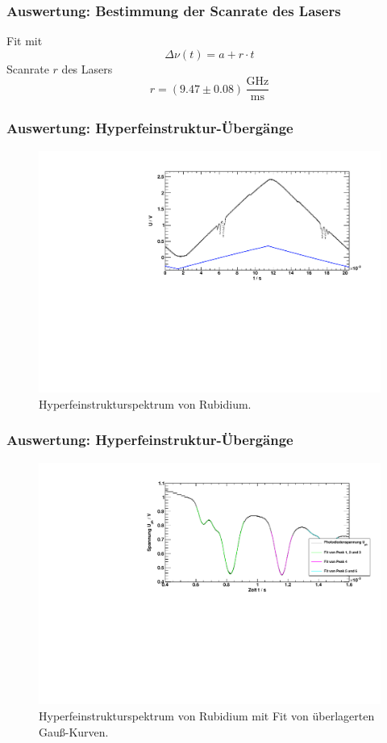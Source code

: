 \begin{frame}
\frametitle{Auswertung: Bestimmung der Scanrate des Lasers}
Fit mit
\begin{equation*}
    \Delta \nu(t) = a + r \cdot t
\end{equation*}
Scanrate $r$ des Lasers
\begin{equation*}
    r = (9.47 \pm 0.08)\,\frac{\text{GHz}}{\text{ms}}
\end{equation*}
\end{frame}

\begin{frame}
\frametitle{Auswertung: Hyperfeinstruktur-Übergänge}
\begin{figure}[H]
    \centering
    \includegraphics[width=\textwidth]{../img/down-hfs.pdf}
    \caption{Hyperfeinstrukturspektrum von Rubidium.}
\end{figure}
\end{frame}

\begin{frame}
\frametitle{Auswertung: Hyperfeinstruktur-Übergänge}
\begin{figure}[H]
    \centering
    \includegraphics[width=\textwidth]{../img/down-hfs_zoom_fit.pdf}  %
    \caption{Hyperfeinstrukturspektrum von Rubidium mit Fit von überlagerten Gauß-Kurven.}
\end{figure}
\end{frame}

